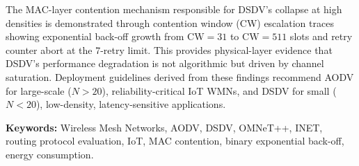 The MAC-layer contention mechanism responsible for DSDV's collapse at high densities
is demonstrated through contention window (CW) escalation traces showing exponential
back-off growth from $\text{CW} = 31$ to $\text{CW} = 511$ slots and retry counter abort
at the 7-retry limit. This provides physical-layer evidence that DSDV's performance
degradation is not algorithmic but driven by channel saturation. Deployment guidelines
derived from these findings recommend AODV for large-scale ($N > 20$),
reliability-critical IoT WMNs, and DSDV for small ($N < 20$), low-density,
latency-sensitive applications.

\vspace{0.5cm}
\noindent\textbf{Keywords:} Wireless Mesh Networks, AODV, DSDV, OMNeT++, INET,
routing protocol evaluation, IoT, MAC contention, binary exponential back-off, energy
consumption.

\newpage
